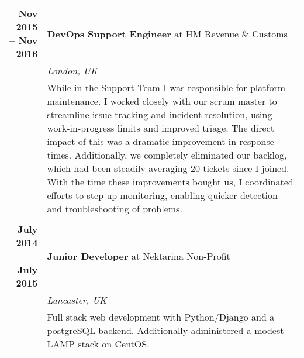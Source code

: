 \documentclass[a4paper,10pt]{article} %
\begin{document}
\begin{tabularx}{\textwidth}{r|X}
\textbf{Nov 2015 -- Nov 2016}       & \textbf{DevOps Support Engineer} at HM Revenue \& Customs \\
                                    & \emph{London, UK} \\
                                    & \footnotesize{While in the Support
                                    Team I was responsible for platform
                                    maintenance. I worked closely with our scrum
                                    master to streamline issue tracking and
                                    incident resolution, using work-in-progress
                                    limits and improved triage.  The direct
                                    impact of this was a dramatic improvement in
                                    response times. Additionally, we completely
                                    eliminated our backlog, which had been
                                    steadily averaging 20 tickets since I
                                    joined. With the time these improvements
                                    bought us, I coordinated efforts to step up
                                    monitoring, enabling quicker detection and
                                    troubleshooting of problems.}\\

\multicolumn{2}{r}{} \\ %

\textbf{July 2014 -- July 2015}     & \textbf{Junior Developer} at {Nektarina Non-Profit}\\
                                    & \emph{Lancaster, UK}\\
                                    & \footnotesize{Full stack web development
                                    with Python/Django and a postgreSQL
                                    backend. Additionally administered a modest
                                    LAMP stack on CentOS.}\\

\end{tabularx}

\end{document}
